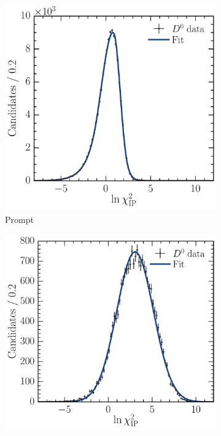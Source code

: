 \begin{figure}
  \begin{subfigure}[b]{0.5\textwidth}
    \centering
    \includegraphics[width=\textwidth]{figures/production/fitting/D0ToKpi_ipchisq_fit_pT_integrated_y_integrated_sig}
    \caption{Prompt}
    \label{fig:prod:fitting:prefits:D0ToKpi:prompt}
  \end{subfigure}
  \begin{subfigure}[b]{0.5\textwidth}
    \centering
    \includegraphics[width=\textwidth]{figures/production/fitting/D0ToKpi_ipchisq_fit_pT_integrated_y_integrated_sec}

\end{subfigure}
\end{figure}
